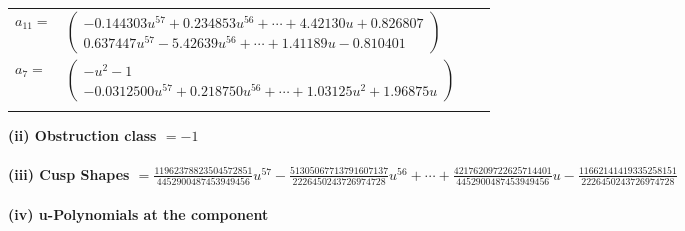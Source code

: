\documentclass[1p]{elsarticle_modified}
\theoremstyle{definition}
\begin{document}
\begin{tabular}{m{7pt} m{180pt} m{7pt} m{180pt} }
\flushright $a_{11}=$&$\begin{pmatrix}-0.144303 u^{57}+0.234853 u^{56}+\cdots+4.42130 u+0.826807\\0.637447 u^{57}-5.42639 u^{56}+\cdots+1.41189 u-0.810401\end{pmatrix}$ \\
\flushright $a_{7}=$&$\begin{pmatrix}- u^2-1\\-0.0312500 u^{57}+0.218750 u^{56}+\cdots+1.03125 u^{2}+1.96875 u\end{pmatrix}$\\&\end{tabular}
\flushleft \textbf{(ii) Obstruction class $= -1$}\\~\\
\flushleft \textbf{(iii) Cusp Shapes $= \frac{11962378823504572851}{4452900487453949456} u^{57}-\frac{51305067713791607137}{2226450243726974728} u^{56}+\cdots+\frac{42176209722625714401}{4452900487453949456} u-\frac{11662141419335258151}{2226450243726974728}$}\\~\\
\newpage\renewcommand{\arraystretch}{1}
\flushleft \textbf{(iv) u-Polynomials at the component}\newline \\
\end{document}
